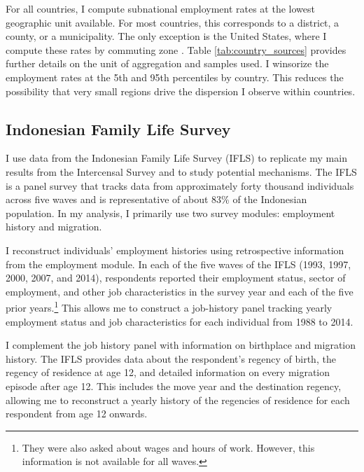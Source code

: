 For all countries, I compute subnational employment rates at the lowest geographic unit available. For most countries, this corresponds to a district, a county, or a municipality. The only exception is the United States, where I compute these rates by commuting zone \citep{Autor2013}. Table \ref{tab:country_sources} provides further details on the unit of aggregation and samples used. I winsorize the employment rates at the 5th and 95th percentiles by country. This reduces the possibility that very small regions drive the dispersion I observe within countries.


\subsection{Indonesian Family Life Survey}
\label{sec:ifls_appendix}
I use data from the Indonesian Family Life Survey (IFLS) to replicate my main results from the Intercensal Survey and to study potential mechanisms. The IFLS is a panel survey that tracks data from approximately forty thousand individuals across five waves and is representative of about 83\% of the Indonesian population. In my analysis, I primarily use two survey modules: employment history and migration.

I reconstruct individuals' employment histories using retrospective information from the employment module. In each of the five waves of the IFLS (1993, 1997, 2000, 2007, and 2014), respondents reported their employment status, sector of employment, and other job characteristics in the survey year and each of the five prior years.\footnote{They were also asked about wages and hours of work. However, this information is not available for all waves.} This allows me to construct a job-history panel tracking yearly employment status and job characteristics for each individual from 1988 to 2014. 

I complement the job history panel with information on birthplace and migration history. The IFLS provides data about the respondent's regency of birth, the regency of residence at age 12, and detailed information on every migration episode after age 12. This includes the move year and the destination regency, allowing me to reconstruct a yearly history of the regencies of residence for each respondent from age 12 onwards.

